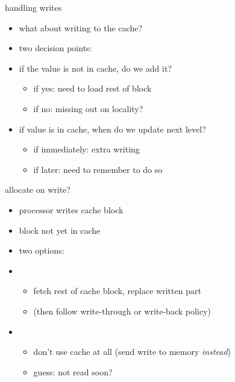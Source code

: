\usetikzlibrary{arrows.meta,matrix,positioning,shapes.callouts,shapes.misc}

\begin{frame}{handling writes}
    \begin{itemize}
    \item what about writing to the cache?
    \item two decision points:
    \vspace{.5cm}
    \item if the value is not in cache, do we add it?
        \begin{itemize}
        \item if yes: need to load rest of block
        \item if no: missing out on locality?
        \end{itemize}   
    \item if value is in cache, when do we update next level?
        \begin{itemize}
        \item if immediately: extra writing
        \item if later: need to remember to do so
        \end{itemize}
    \end{itemize}
\end{frame}

\begin{frame}{allocate on write?}
\begin{itemize}
\item processor writes  cache block
\item block not yet in cache
\item two options:
\vspace{0.5cm}
\item {}
    \begin{itemize}
    \item fetch rest of cache block, replace written part
    \item (then follow write-through or write-back policy)
    \end{itemize}
\item {}
    \begin{itemize}
    \item don't use cache at all (send write to memory \textit{instead})
    \item guess: not read soon?
    \end{itemize}
\end{itemize}
\end{frame}

